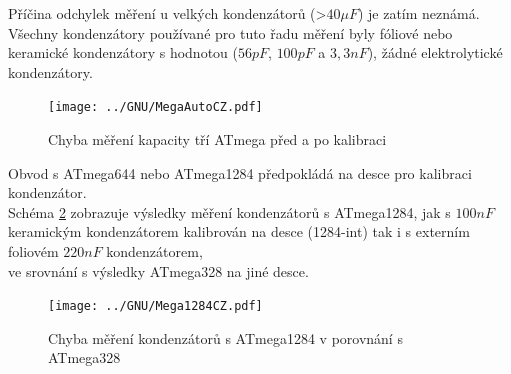 Příčina odchylek měření u velkých kondenzátorů (\textgreater\(40\mu F\))  je
zatím neznámá.\\ Všechny kondenzátory používané pro tuto řadu měření byly
fóliové nebo keramické kondenzátory s hodnotou (\(56pF\), \(100pF\) a \(3,3nF\)), žádné elektrolytické kondenzátory.

\begin{figure}[H]
\centering
\texttt{[image: ../GNU/MegaAutoCZ.pdf]}
\caption{Chyba měření kapacity tří ATmega před a po kalibraci}
\label{fig:MegaAuto}
\end{figure}

Obvod s ATmega644 nebo ATmega1284 předpokládá na desce pro kalibraci kondenzátor.\\
Schéma \ref{fig:Mega1284} zobrazuje výsledky měření kondenzátorů s ATmega1284,
jak s \(100nF\)  keramickým kondenzátorem kalibrován na desce (1284-int) tak i s externím foliovém \(220nF\) kondenzátorem,\\
ve srovnání s výsledky ATmega328 na jiné desce.

\begin{figure}[H]
\centering
\texttt{[image: ../GNU/Mega1284CZ.pdf]}
\caption{Chyba měření kondenzátorů s ATmega1284 v porovnání s ATmega328}
\label{fig:Mega1284}
\end{figure}

